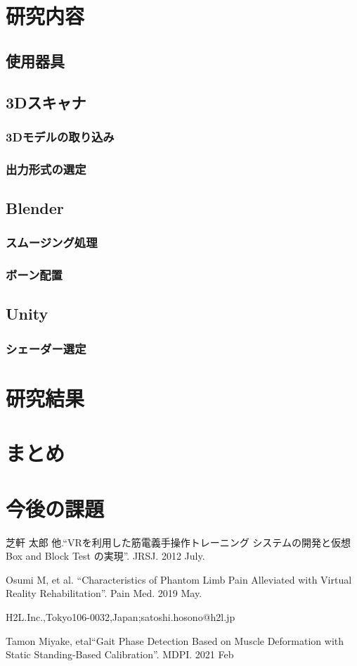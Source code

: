 \documentclass[report]{ltjsbook}
\begin{document}
\chapter{研究内容}
	\section{使用器具}
	\section{3Dスキャナ}
		\subsection{3Dモデルの取り込み}
		\subsection{出力形式の選定}
	\section{Blender}
		\subsection{スムージング処理}
		\subsection{ボーン配置}
	\section{Unity}
		\subsection{シェーダー選定}
		\subsection{}
\chapter{研究結果}
\chapter{まとめ}
\chapter{今後の課題}
\begin{thebibliography}{99}

	芝軒 太郎 他.``VRを利用した筋電義手操作トレーニング
	システムの開発と仮想 Box and Block Test の実現''.
	JRSJ. 2012 July.

	Osumi M, et al.
	``Characteristics of Phantom Limb Pain Alleviated
	with Virtual Reality Rehabilitation''.
	Pain Med. 2019 May.

	H2L.Inc.,Tokyo106-0032,Japan;satoshi.hosono@h2l.jp

	Tamon Miyake, etal``Gait Phase Detection Based on Muscle Deformation
	with Static Standing-Based Calibration''.
	MDPI. 2021 Feb

\end{thebibliography}
\end{document}
